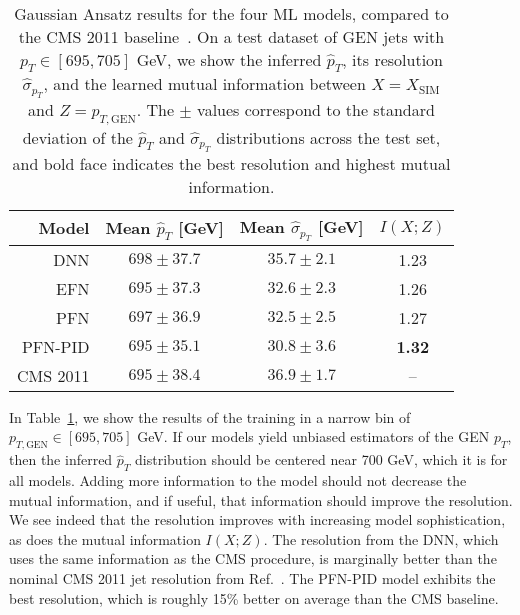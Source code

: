\documentclass[prl,twocolumn,superscriptaddress,longbibliography,preprintnumbers,floatfix,nofootinbib]{revtex4-1}
\DeclareRobustCommand{\Tab}[1]{Table~\ref{tab:#1}}
\DeclareRobustCommand{\Ref}[1]{Ref.~\cite{#1}}
\newcommand{\GaussianAnsatz}{{Gaussian Ansatz}\xspace}
\begin{document}
\begin{table}[t]
    \centering
    \def\arraystretch{1.8}
    \begin{tabular}{r @{$\quad$} c @{$\quad$} c @{$\quad$} c @{$\quad$}   }
    \hline\hline
      Model  & Mean $\hat{p}_T$ [GeV] & Mean $\hat{\sigma}_{p_T}$ [GeV] & $I(X;Z)$ \\
      \hline
      DNN & $698 \pm 37.7$ & $35.7 \pm 2.1$ & 1.23 \\
      EFN  & $695 \pm 37.3$ & $32.6 \pm 2.3$ & 1.26 \\
      PFN  & $697 \pm 36.9$ & $32.5 \pm 2.5$ & 1.27 \\
      PFN-PID  & ${695 \pm 35.1}$ & $\mathbf{30.8 \pm 3.6}$ & \textbf{1.32} \\
      \hline
      CMS 2011 & $695 \pm 38.4$ & $36.9 \pm 1.7$ & --  \\

    \hline\hline
    \end{tabular}
    \caption{\GaussianAnsatz results for the four ML models, compared to the CMS 2011 baseline~\cite{Khachatryan_2017}.
    On a test dataset of GEN jets with $p_T \in [695,705]$ GeV, we show the inferred $\hat{p}_T$, its resolution $\hat{\sigma}_{p_T}$, and the learned mutual information between $X = X_{\text{SIM}}$ and $Z = p_{T,\text{GEN}}$.
    The $\pm$ values correspond to the standard deviation of the $\hat{p}_T$ and $\hat{\sigma}_{p_T}$ distributions across the test set, and bold face indicates the best resolution and highest mutual information.
    }
    \label{tab:JEC-results}
\end{table}



In \Tab{JEC-results}, we show the results of the training in a narrow bin of $p_{T, \text{GEN}} \in [695,705]$ GeV.
%
If our models yield unbiased estimators of the GEN $p_T$, then the inferred $\hat{p}_T$ distribution should be centered near 700 GeV, which it is for all models.
%
Adding more information to the model should not decrease the mutual information, and if useful, that information should improve the resolution.
%
We see indeed that the resolution improves with increasing model sophistication, as does the mutual information $I(X;Z)$.
%
The resolution from the DNN, which uses the same information as the CMS procedure, is marginally better than the nominal CMS 2011 jet resolution from \Ref{Khachatryan_2017}.
%
The PFN-PID model exhibits the best resolution, which is roughly 15\% better on average than the CMS baseline.
\end{document}
